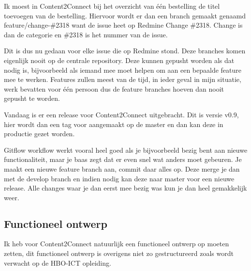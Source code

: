 Ik moest in Content2Connect bij het overzicht van één bestelling de titel toevoegen van de bestelling. Hiervoor wordt er dan een branch gemaakt genaamd feature/change-\#2318 want de issue heet op Redmine Change \#2318. Change is dan de categorie en \#2318 is het nummer van de issue.

Dit is dus nu gedaan voor elke issue die op Redmine stond. Deze branches komen eigenlijk nooit op de centrale repository. Deze kunnen gepusht worden als dat nodig is, bijvoorbeeld als iemand mee moet helpen om aan een bepaalde feature mee te werken. Features zullen meest van de tijd, in ieder geval in mijn situatie, werk bevatten voor één persoon dus de feature branches hoeven dan nooit gepusht te worden.

\newline

Vandaag is er een release voor Content2Connect uitgebracht. Dit is versie v0.9, hier wordt dan een tag voor aangemaakt op de master en dan kan deze in productie gezet worden.

Gitflow workflow werkt vooral heel goed als je bijvoorbeeld bezig bent aan nieuwe functionaliteit, maar je baas zegt dat er even snel wat anders moet gebeuren. Je maakt een nieuwe feature branch aan, commit daar alles op. Deze merge je dan met de develop branch en indien nodig kan deze naar master voor een nieuwe release. Alle changes waar je dan eerst mee bezig was kun je dan heel gemakkelijk weer.

\clearpage

\subsection{Functioneel ontwerp}
Ik heb voor Content2Connect natuurlijk een functioneel ontwerp op moeten zetten, dit functioneel ontwerp is overigens niet zo gestructureerd zoals wordt verwacht op de HBO-ICT opleiding.
